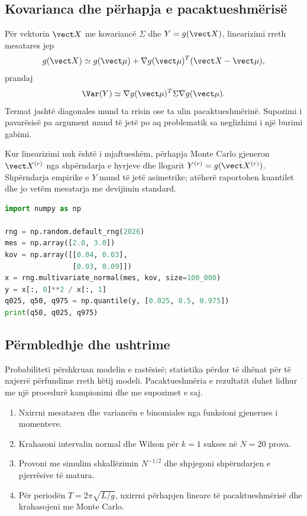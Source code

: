 \subsection{Kovarianca dhe përhapja e pacaktueshmërisë}
Për vektorin $\vect X$ me kovariancë $\Sigma$ dhe $Y=g(\vect X)$, linearizimi rreth mesatares jep
\begin{equation}
 g(\vect X)\simeq g(\vect\mu)+\nabla g(\vect\mu)^T(\vect X-\vect\mu),
\end{equation}
prandaj
\begin{equation}
 \Var(Y)\simeq\nabla g(\vect\mu)^T\Sigma\nabla g(\vect\mu).
\end{equation}
Termat jashtë diagonales mund ta rrisin ose ta ulin pacaktueshmërinë. Supozimi i pavarësisë pa argument mund të jetë po aq problematik sa neglizhimi i një burimi gabimi.

Kur linearizimi nuk është i mjaftueshëm, përhapja Monte Carlo gjeneron $\vect X^{(r)}$ nga shpërndarja e hyrjeve dhe llogarit $Y^{(r)}=g(\vect X^{(r)})$. Shpërndarja empirike e $Y$ mund të jetë asimetrike; atëherë raportohen kuantilet dhe jo vetëm mesatarja me devijimin standard.

\begin{lstlisting}[language=Python,caption={Përhapje Monte Carlo e hyrjeve të korreluara.}]
import numpy as np

rng = np.random.default_rng(2026)
mes = np.array([2.0, 3.0])
kov = np.array([[0.04, 0.03],
                [0.03, 0.09]])
x = rng.multivariate_normal(mes, kov, size=100_000)
y = x[:, 0]**2 / x[:, 1]
q025, q50, q975 = np.quantile(y, [0.025, 0.5, 0.975])
print(q50, q025, q975)
\end{lstlisting}

\subsection{Përmbledhje dhe ushtrime}
Probabiliteti përshkruan modelin e rastësisë; statistika përdor të dhënat për të nxjerrë përfundime rreth këtij modeli. Pacaktueshmëria e rezultatit duhet lidhur me një procedurë kampionimi dhe me supozimet e saj.
\begin{enumerate}
\item Nxirrni mesataren dhe variancën e binomiales nga funksioni gjenerues i momenteve.
\item Krahasoni intervalin normal dhe Wilson për $k=1$ sukses në $N=20$ prova.
\item Provoni me simulim shkallëzimin $N^{-1/2}$ dhe shpjegoni shpërndarjen e pjerrësive të matura.
\item Për periodën $T=2\pi\sqrt{L/g}$, nxirrni përhapjen lineare të pacaktueshmërisë dhe krahasojeni me Monte Carlo.
\end{enumerate}
